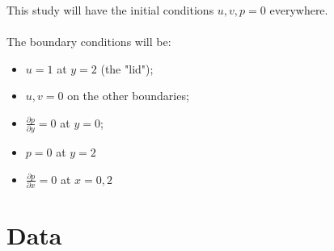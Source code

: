 \documentclass{article}
\begin{document}
\begin{boxA}
	This study will have the initial conditions $u, v, p = 0$
	everywhere. \\
	\\
	The boundary conditions will be:
	\begin{itemize}
		\item $u=1$ at $y=2$ (the "lid");
		\item $u, v=0$ on the other boundaries;
		\item $\frac{\partial p}{\partial y}=0$ at $y=0$;
		\item $p=0$ at $y=2$
		\item $\frac{\partial p}{\partial x}=0$ at $x=0,2$
	\end{itemize}
\end{boxA}

\section{Data\label{data}}
\end{document}
